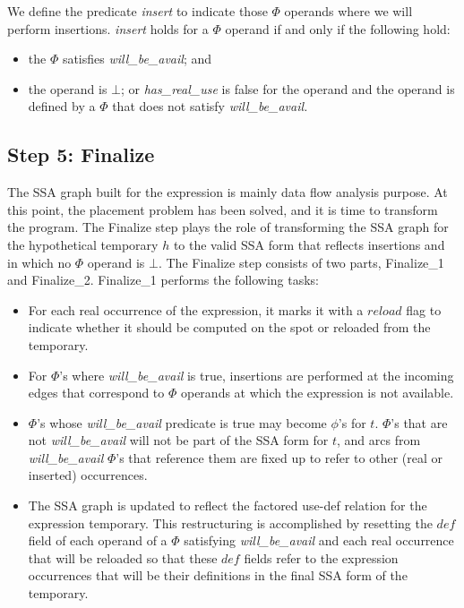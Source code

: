 We define the predicate \emph{insert} to indicate those $\Phi$ operands
where we will perform insertions.  \emph{insert} holds for a $\Phi$ operand
if and only if the following hold:

\begin{itemize}
\item the $\Phi$ satisfies \emph{will\_be\_avail}; and
\item the operand is $\bot$; or \emph{has\_real\_use} is false for the
operand and the operand is defined by a $\Phi$ that does not satisfy
\em{will\_be\_avail}.
\end{itemize}

\subsection{Step 5: Finalize}

The SSA graph built for the expression is mainly data flow analysis purpose.
At this point, the placement problem has been solved, and it is time to
transform the program.
The Finalize step plays the role of transforming the SSA graph for the
hypothetical temporary $h$ to the valid SSA form that reflects insertions 
and in which no $\Phi$ operand is $\bot$.  The Finalize step consists of
two parts, Finalize\_1 and Finalize\_2.  Finalize\_1 performs the
following tasks:

\begin{itemize}
\item For each real occurrence of the expression, it marks it with a $reload$
flag to indicate whether it should be computed on the spot or reloaded
from the temporary.
\item For $\Phi$'s where \emph{will\_be\_avail} is true, insertions are
performed at the incoming edges that correspond to $\Phi$ operands at which
the expression is not available.
\item $\Phi$'s whose \emph{will\_be\_avail} predicate is true may become
$\phi$'s for $t$.  $\Phi$'s that are not \emph{will\_be\_avail} will not
be part of the SSA form for $t$, and arcs from \emph{will\_be\_avail} 
$\Phi$'s that reference them are fixed up to refer to other (real or 
inserted) occurrences.
\item The SSA graph is updated to reflect the factored use-def relation
for the expression temporary.  This restructuring is accomplished by
resetting the $def$ field of each operand of a $\Phi$ satisfying
\emph{will\_be\_avail} and each real occurrence that will be reloaded so
that these $def$ fields refer to the expression occurrences that will be
their definitions in the final SSA form of the temporary.
\end{itemize}

